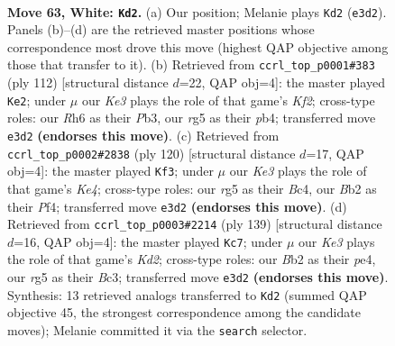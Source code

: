 \documentclass[11pt]{article}
\begin{document}
\clearpage

\begin{figure}[p]\centering
\begin{subfigure}{0.46\textwidth}\centering
\resizebox{\linewidth}{!}{%
\newchessgame
\chessboard[
  setfen={2k5/8/7R/pp4r1/b1p5/P1P1K3/1B6/8 w - - 32 63},
  showmover=false,
  pgfstyle=straightmove, color=movearrow, markmove={e3-d2}
]}
\caption{}
\end{subfigure}\hfill
\begin{subfigure}{0.46\textwidth}\centering
\resizebox{\linewidth}{!}{%
\newchessgame
\chessboard[
  setfen={8/8/k4p2/1p3Bp1/1p3bP1/1P3P2/5K2/8 w - - 0 57},
  showmover=false,
  pgfstyle=straightmove, color=movearrow, markmove={f2-e2}
]}
\caption{}
\end{subfigure}
\\[4pt]
\begin{subfigure}{0.46\textwidth}\centering
\resizebox{\linewidth}{!}{%
\newchessgame
\chessboard[
  setfen={8/p5p1/P1k2b1p/7P/2B1KP2/8/8/8 w - - 27 61},
  showmover=false,
  pgfstyle=straightmove, color=movearrow, markmove={e4-f3}
]}
\caption{}
\end{subfigure}\hfill
\begin{subfigure}{0.46\textwidth}\centering
\resizebox{\linewidth}{!}{%
\newchessgame
\chessboard[
  setfen={8/3k4/3p1p2/p4P2/2B1P2K/1Pb5/P7/8 b - - 34 70},
  showmover=false,
  pgfstyle=straightmove, color=movearrow, markmove={d7-c7}
]}
\caption{}
\end{subfigure}
\caption{\textbf{Move 63, White: \texttt{Kd2}.} (a) Our position; Melanie plays \texttt{Kd2} (\texttt{e3d2}). Panels (b)--(d) are the retrieved master positions whose correspondence most drove this move (highest QAP objective among those that transfer to it). (b) Retrieved from \texttt{ccrl\_top\_p0001\#383} (ply 112) [structural distance $d$=22, QAP obj=4]: the master played \texttt{Ke2}; under $\mu$ our \emph{Ke3} plays the role of that game's \emph{Kf2}; cross-type roles: our \emph{R}h6 as their \emph{P}b3, our \emph{r}g5 as their \emph{p}b4; transferred move \texttt{e3d2} \textbf{(endorses this move)}. (c) Retrieved from \texttt{ccrl\_top\_p0002\#2838} (ply 120) [structural distance $d$=17, QAP obj=4]: the master played \texttt{Kf3}; under $\mu$ our \emph{Ke3} plays the role of that game's \emph{Ke4}; cross-type roles: our \emph{r}g5 as their \emph{B}c4, our \emph{B}b2 as their \emph{P}f4; transferred move \texttt{e3d2} \textbf{(endorses this move)}. (d) Retrieved from \texttt{ccrl\_top\_p0003\#2214} (ply 139) [structural distance $d$=16, QAP obj=4]: the master played \texttt{Kc7}; under $\mu$ our \emph{Ke3} plays the role of that game's \emph{Kd2}; cross-type roles: our \emph{B}b2 as their \emph{p}e4, our \emph{r}g5 as their \emph{B}c3; transferred move \texttt{e3d2} \textbf{(endorses this move)}. Synthesis: 13 retrieved analogs transferred to \texttt{Kd2} (summed QAP objective 45, the strongest correspondence among the candidate moves); Melanie committed it via the \texttt{search} selector.}
\label{fig:thought-m124}
\end{figure}
\end{document}
